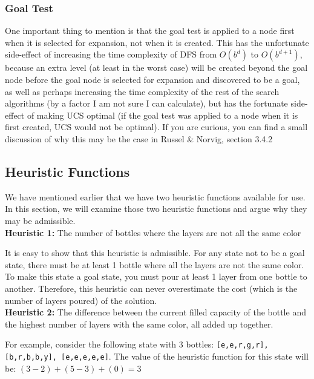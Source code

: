 \documentclass{article}
\begin{document}
\subsubsection{Goal Test}
One important thing to mention is that the goal test is applied to a node first when it is selected for expansion, not when it is created. This has the unfortunate side-effect of increasing the time complexity of DFS from $O(b^{d})$ to $O(b^{d+1})$, because an extra level (at least in the worst case) will be created beyond the goal node before the goal node is selected for expansion and discovered to be a goal, as well as perhaps increasing the time complexity of the rest of the search algorithms (by a factor I am not sure I can calculate), but has the fortunate side-effect of making UCS optimal (if the goal test was applied to a node when it is first created, UCS would not be optimal). If you are curious, you can find a small discussion of why this may be the case in Russel \& Norvig, section 3.4.2

\subsection{Heuristic Functions}

We have mentioned earlier that we have two heuristic functions available for use. In this section, we will examine those two heuristic functions and argue why they may be admissible. \\

\textbf{Heuristic 1: } The number of bottles where the layers are not all the same color

It is easy to show that this heuristic is admissible. For any state not to be a goal state, there must be at least 1 bottle where all the layers are not the same color. To make this state a goal state, you must pour at least 1 layer from one bottle to another. Therefore, this heuristic can never overestimate the cost (which is the number of layers poured) of the solution. \\


\textbf{Heuristic 2: } The difference between the current filled capacity of the bottle and the highest number of layers with the same color, all added up together.

For example, consider the following state with 3 bottles: \texttt{[e,e,r,g,r], [b,r,b,b,y], [e,e,e,e,e]}. The value of the heuristic function for this state will be: $(3 - 2) + (5 - 3) + (0) = 3$ \\
\end{document}
